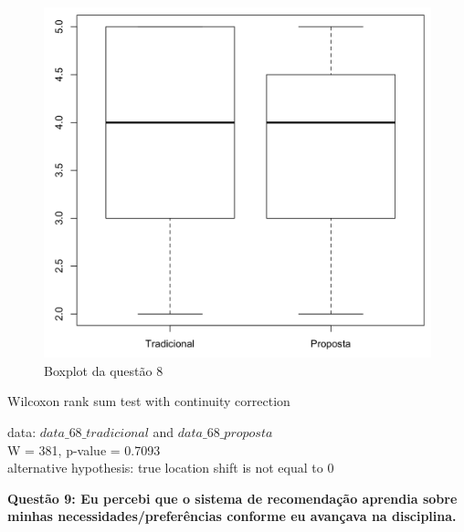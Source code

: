 \begin{figure}[htb]
  \caption{\label{fig:questao8-boxplot}Boxplot da questão 8}
  \begin{center}
      \includegraphics[scale=0.6]{./Figuras/questao8-boxplot.png}
  \end{center}
\end{figure}

Wilcoxon rank sum test with continuity correction

data:  $data\_68\_tradicional$ and $data\_68\_proposta$\\
W = 381, p-value = 0.7093\\
alternative hypothesis: true location shift is not equal to 0

\newpage
\textbf{Questão 9: Eu percebi que o sistema de recomendação aprendia sobre minhas necessidades/preferências conforme eu avançava na disciplina.}

